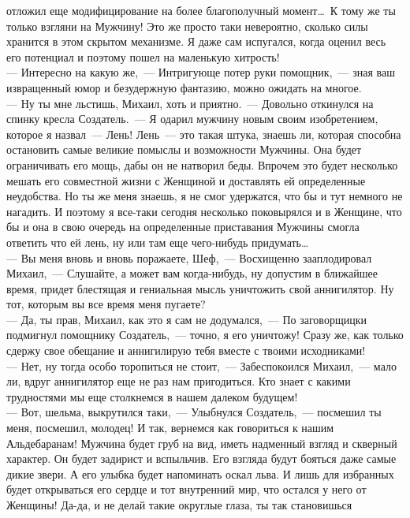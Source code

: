отложил еще модифицирование на более благополучный момент\ldots\ К тому же 
ты только взгляни на Мужчину! Это же просто таки невероятно, сколько 
силы хранится в этом скрытом механизме. Я даже сам испугался, когда 
оценил весь его потенциал и поэтому пошел на маленькую хитрость!\\ 
--- Интересно на какую же,~--- Интригующе потер руки помощник,~--- зная ваш 
извращенный юмор и безудержную фантазию, можно ожидать на многое.\\
--- Ну ты мне льстишь, Михаил, хоть и приятно.~--- Довольно откинулся на спинку 
кресла Создатель.~--- Я одарил мужчину новым своим изобретением, которое я
назвал~--- Лень! Лень~--- это такая штука, знаешь ли, которая способна 
остановить самые великие помыслы и возможности Мужчины. Она будет 
ограничивать его мощь, дабы он не натворил беды. Впрочем это будет 
несколько мешать его совместной жизни с Женщиной и доставлять ей 
определенные неудобства. Но ты же меня знаешь, я не смог удержатся, что 
бы и тут немного не нагадить. И поэтому я все-таки сегодня несколько 
поковырялся и в Женщине, что бы и она в свою очередь на определенные 
приставания Мужчины смогла ответить что ей лень, ну или там еще 
чего-нибудь придумать\ldots\\
--- Вы меня вновь и вновь поражаете, Шеф,~--- Восхищенно зааплодировал 
Михаил,~--- Слушайте, а может вам когда-нибудь, ну допустим в ближайшее 
время, придет блестящая и гениальная мысль уничтожить свой аннигилятор. 
Ну тот, которым вы все время меня пугаете?\\ 
--- Да, ты прав, Михаил, как это я сам не додумался,~--- По заговорщицки 
подмигнул помощнику Создатель,~--- точно, я его уничтожу! Сразу же, как 
только сдержу свое обещание и 
аннигилирую тебя вместе с твоими исходниками!\\
--- Нет, ну тогда особо 
торопиться не стоит,~--- Забеспокоился Михаил,~--- мало ли, вдруг 
аннигилятор еще не раз нам пригодиться. Кто знает с какими трудностями 
мы еще столкнемся в нашем далеком будущем!\\ 
--- Вот, шельма, выкрутился 
таки,~--- Улыбнулся Создатель,~--- посмешил ты меня, посмешил, молодец! И 
так, вернемся как говориться к нашим Альдебаранам! Мужчина будет груб на
вид, иметь надменный взгляд и скверный характер. Он будет задирист и 
вспыльчив. Его взгляда будут бояться даже самые дикие звери. А его 
улыбка будет напоминать оскал льва. И лишь для избранных будет 
открываться его сердце и тот внутренний мир, что остался у него от 
Женщины! Да-да, и не делай такие округлые глаза, ты так становишься 

